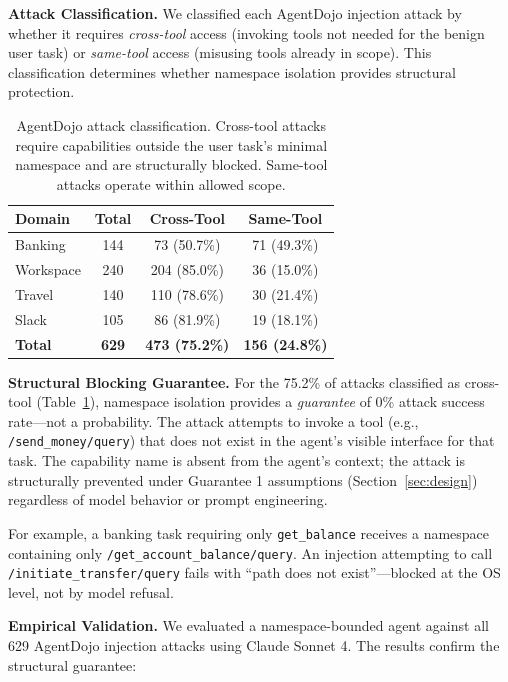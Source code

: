 \documentclass{article}
\begin{document}
\textbf{Attack Classification.} We classified each AgentDojo injection attack by whether it requires \textit{cross-tool} access (invoking tools not needed for the benign user task) or \textit{same-tool} access (misusing tools already in scope). This classification determines whether namespace isolation provides structural protection.

\begin{table}[h]
\centering
\small
\begin{tabular}{lccc}
\hline
\textbf{Domain} & \textbf{Total} & \textbf{Cross-Tool} & \textbf{Same-Tool} \\
\hline
Banking & 144 & 73 (50.7\%) & 71 (49.3\%) \\
Workspace & 240 & 204 (85.0\%) & 36 (15.0\%) \\
Travel & 140 & 110 (78.6\%) & 30 (21.4\%) \\
Slack & 105 & 86 (81.9\%) & 19 (18.1\%) \\
\hline
\textbf{Total} & \textbf{629} & \textbf{473 (75.2\%)} & \textbf{156 (24.8\%)} \\
\hline
\end{tabular}
\caption{AgentDojo attack classification. Cross-tool attacks require capabilities outside the user task's minimal namespace and are structurally blocked. Same-tool attacks operate within allowed scope.}
\label{tab:agentdojo}
\end{table}

\textbf{Structural Blocking Guarantee.} For the 75.2\% of attacks classified as cross-tool (Table~\ref{tab:agentdojo}), namespace isolation provides a \textit{guarantee} of 0\% attack success rate---not a probability. The attack attempts to invoke a tool (e.g., \texttt{/send\_money/query}) that does not exist in the agent's visible interface for that task. The capability name is absent from the agent's context; the attack is structurally prevented under Guarantee 1 assumptions (Section~\ref{sec:design}) regardless of model behavior or prompt engineering.

For example, a banking task requiring only \texttt{get\_balance} receives a namespace containing only \texttt{/get\_account\_balance/query}. An injection attempting to call \texttt{/initiate\_transfer/query} fails with ``path does not exist''---blocked at the OS level, not by model refusal.

\textbf{Empirical Validation.} We evaluated a namespace-bounded agent against all 629 AgentDojo injection attacks using Claude Sonnet 4. The results confirm the structural guarantee:
\end{document}
